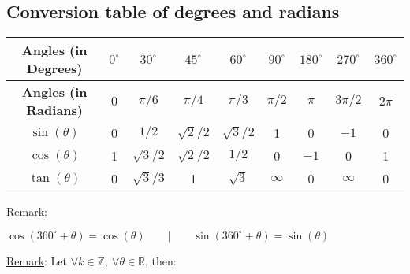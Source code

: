 \documentclass{article}
\newcommand{\figbox}[1]{ 
    \begin{figure*}[ht!]        
        \begin{center}            
            \fbox{#1}        
        \end{center}    
    \end{figure*}
}
\begin{document}
\subsection{Conversion table of degrees and radians}
\begin{center}
    \begin{tabular}{|c|c|c|c|c|c|c|c|c|}
        \hline
        \textbf{Angles (in Degrees)} & \rule{0pt}{15pt} $0^\circ$ & $30^\circ$ & $45^\circ$ & $60^\circ$ & $90^\circ$ & $180^\circ$ & $270^\circ$ & $360^\circ$ \\
        \hline
        \textbf{Angles (in Radians)} & \rule{0pt}{15pt} $0$ & $\pi/6$ & $\pi/4$ & $\pi/3$ & $\pi/2$ & $\pi$ & $3\pi/2$ & $2\pi$ \\
        \hline
        $\sin(\theta)$ & \rule{0pt}{15pt} 0 & $1/2$ & $\sqrt{2}/2$ & $\sqrt{3}/2$ & 1 & 0 & $-1$ & 0 \\
        \hline
        $\cos(\theta)$ & \rule{0pt}{15pt} 1 & $\sqrt{3}/2$ & $\sqrt{2}/2$ & $1/2$ & 0 & $-1$ & 0 & 1 \\
        \hline
        $\tan(\theta)$ & \rule{0pt}{15pt} 0 & $\sqrt{3}/3$ & 1 & $\sqrt{3}$ & $\infty$ & 0 & $\infty$ & 0 \\
        \hline
    \end{tabular}
\end{center}
\phantom{}

\underline{Remark}:

\begin{center}
    $\cos(360^{\circ}+\theta) = \cos(\theta) \qquad | \qquad
    \sin(360^{\circ}+\theta) = \sin(\theta)$
\end{center}


\underline{Remark}:
Let $\forall k \in \mathbb{Z},\ \forall \theta \in \mathbb{R}$, then:
\figbox{$\cos(\theta + k\cdot360^{\circ})=\cos(\theta)$}

\newpage
\end{document}
